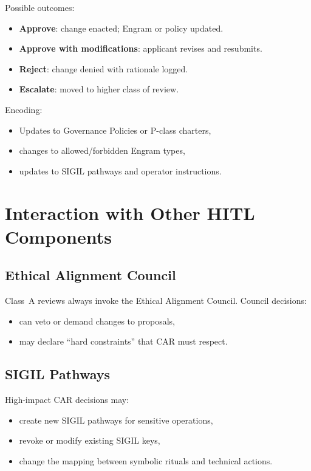 Possible outcomes:
\begin{itemize}
    \item \textbf{Approve}: change enacted; Engram or policy updated.
    \item \textbf{Approve with modifications}: applicant revises and resubmits.
    \item \textbf{Reject}: change denied with rationale logged.
    \item \textbf{Escalate}: moved to higher class of review.
\end{itemize}

Encoding:
\begin{itemize}
    \item Updates to Governance Policies or P-class charters,
    \item changes to allowed/forbidden Engram types,
    \item updates to SIGIL pathways and operator instructions.
\end{itemize}

\section{Interaction with Other HITL Components}

\subsection{Ethical Alignment Council}

Class~A reviews always invoke the Ethical Alignment Council.  
Council decisions:
\begin{itemize}
    \item can veto or demand changes to proposals,
    \item may declare ``hard constraints'' that CAR must respect.
\end{itemize}

\subsection{SIGIL Pathways}

High-impact CAR decisions may:
\begin{itemize}
    \item create new SIGIL pathways for sensitive operations,
    \item revoke or modify existing SIGIL keys,
    \item change the mapping between symbolic rituals and technical actions.
\end{itemize}

